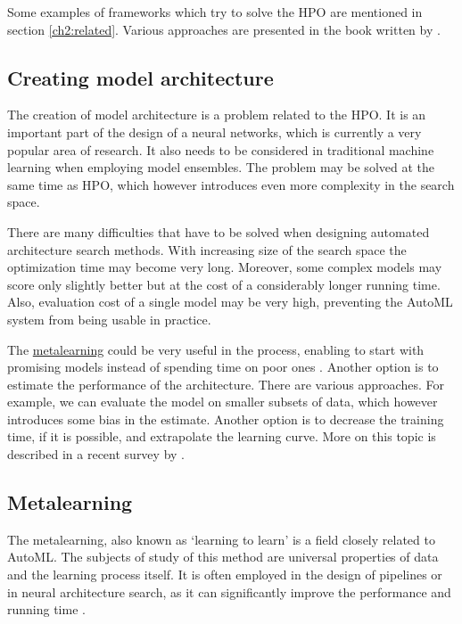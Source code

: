 Some examples of frameworks which try to solve the HPO are mentioned in section
\ref{ch2:related}. Various approaches are presented in the book written by
\cite{automl_book}.

\subsection{Creating model architecture} \label{sec:modelarch}
The creation of model architecture is a problem related to the HPO. It is an
important part of the design of a neural networks, which is currently a very
popular area of research. It also needs to be considered in traditional machine
learning when employing model ensembles. The problem may be solved at the same
time as HPO, which however introduces even more complexity in the search space.

There are many difficulties that have to be solved when designing automated
architecture search methods. With increasing size of the search space 
the optimization time may become very long.
Moreover, some complex models may score only slightly better
but at the cost of a considerably longer running time. Also, evaluation cost of
a single model may be very high, preventing the AutoML system from being usable
in practice.

The \hyperref[metalearning]{metalearning} could be very useful in the process,
enabling to start with promising models instead of spending time on poor ones
\citep{DBLP:journals/corr/abs-1810-03548}.
Another option is to estimate the performance of the architecture. There are
various approaches. For example, we can evaluate the model on smaller subsets of
data, which however introduces some bias in the estimate. Another option is to
decrease the training time, if it is possible, and extrapolate the learning
curve. More on this topic is described in a recent survey by
\cite{2018arXiv180805377E}.

\subsection{Metalearning} \label{metalearning}
The metalearning, also known as `learning to learn' is a field closely related
to AutoML. The subjects of study of this method are universal properties of 
data and the learning process itself. It is often employed in the design of
pipelines or in neural architecture search, as it can significantly
improve the performance and running time
\citep{DBLP:journals/corr/abs-1810-03548}.

